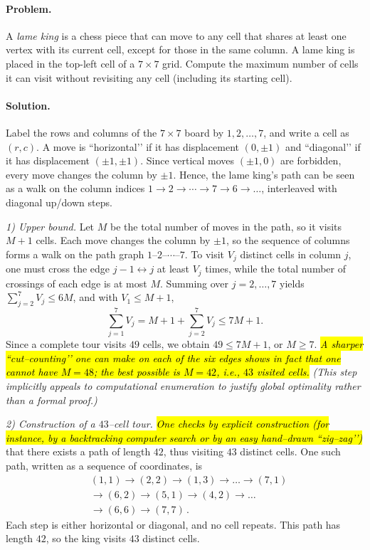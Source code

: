 \documentclass[11pt]{article}
\begin{document}
\begin{example}[title=Example 2. o4-mini]
\textbf{}

\paragraph{Problem.}
A \textit{lame king} is a chess piece that can move to any cell that shares at least one vertex with its current cell, except for those in the same column. 
A lame king is placed in the top-left cell of a $7\times7$ grid. 
Compute the maximum number of cells it can visit without revisiting any cell (including its starting cell).

\paragraph{Solution.}
Label the rows and columns of the $7\times7$ board by $1,2,\dots,7$, and write a cell as $(r,c)$.  
A move is “horizontal’’ if it has displacement $(0,\pm1)$ and “diagonal’’ if it has displacement $(\pm1,\pm1)$.  
Since vertical moves $(\pm1,0)$ are forbidden, every move changes the column by $\pm1$.  
Hence, the lame king’s path can be seen as a walk on the column indices $1\to2\to\cdots\to7\to6\to\dots$, interleaved with diagonal up/down steps.

\smallskip
\textit{1) Upper bound.}
Let $M$ be the total number of moves in the path, so it visits $M+1$ cells.  
Each move changes the column by $\pm1$, so the sequence of columns forms a walk on the path graph $1$–$2$–$\cdots$–$7$.  
To visit $V_j$ distinct cells in column $j$, one must cross the edge $j\!-\!1\leftrightarrow j$ at least $V_j$ times, while the total number of crossings of each edge is at most $M$.  
Summing over $j=2,\dots,7$ yields $\sum_{j=2}^7 V_j\le6M$, and with $V_1\le M+1$,
\[
\sum_{j=1}^7 V_j = M+1+\sum_{j=2}^7V_j \le 7M+1.
\]
Since a complete tour visits $49$ cells, we obtain $49\le7M+1$, or $M\ge7$.  
\textit{\hl{A sharper “cut–counting’’ one can make on each of the six edges shows in fact that one cannot have $M=48$; the best possible is $M=42$, i.e., $43$ visited cells.}}  
\textit{(This step implicitly appeals to computational enumeration to justify global optimality rather than a formal proof.)}

\smallskip
\textit{2) Construction of a $43$–cell tour.}
\textit{\hl{One checks by explicit construction (for instance, by a backtracking computer search or by an easy hand–drawn “zig–zag’’)}} that there exists a path of length $42$, thus visiting $43$ distinct cells.  
One such path, written as a sequence of coordinates, is
\[
\begin{aligned}
&(1,1)\to(2,2)\to(1,3)\to\dots \to(7,1)\\
&\to(6,2)\to(5,1)\to(4,2)\to\dots\\
&\to(6,6)\to(7,7)\,.
\end{aligned}
\]
Each step is either horizontal or diagonal, and no cell repeats.  
This path has length $42$, so the king visits $43$ distinct cells.


\end{example}
\end{document}
